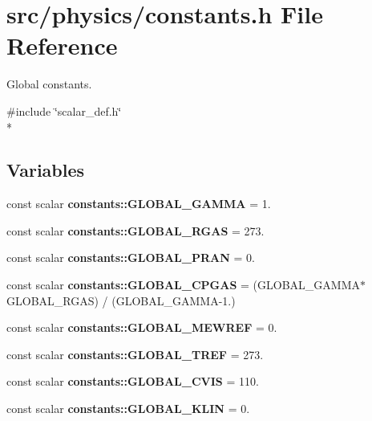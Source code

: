 \section{src/physics/constants.h File Reference}
\label{constants_8h}


Global constants.  


{\ttfamily \#include \char`\"{}scalar\-\_\-def.\-h\char`\"{}}\\*
\subsection*{Variables}
\begin{DoxyCompactItemize}
\item 
const scalar {\bfseries constants\-::\-G\-L\-O\-B\-A\-L\-\_\-\-G\-A\-M\-M\-A} = 1.\label{namespaceconstants_ad42591610ac99d42e07dd55f4b21f644}

\item 
const scalar {\bfseries constants\-::\-G\-L\-O\-B\-A\-L\-\_\-\-R\-G\-A\-S} = 273.\label{namespaceconstants_a4626bf9b70df5f7d210c417a1a289c7b}

\item 
const scalar {\bfseries constants\-::\-G\-L\-O\-B\-A\-L\-\_\-\-P\-R\-A\-N} = 0.\label{namespaceconstants_a3ab911ef1a3ce059745291c010c0d848}

\item 
const scalar {\bfseries constants\-::\-G\-L\-O\-B\-A\-L\-\_\-\-C\-P\-G\-A\-S} = (G\-L\-O\-B\-A\-L\-\_\-\-G\-A\-M\-M\-A$\ast$G\-L\-O\-B\-A\-L\-\_\-\-R\-G\-A\-S) / (G\-L\-O\-B\-A\-L\-\_\-\-G\-A\-M\-M\-A-\/1.)\label{namespaceconstants_a6bb505aea5de44f15baacfe4e2e65605}

\item 
const scalar {\bfseries constants\-::\-G\-L\-O\-B\-A\-L\-\_\-\-M\-E\-W\-R\-E\-F} = 0.\label{namespaceconstants_ad00c7a37d93a7c052fe6ba743fe13388}

\item 
const scalar {\bfseries constants\-::\-G\-L\-O\-B\-A\-L\-\_\-\-T\-R\-E\-F} = 273.\label{namespaceconstants_aab82f463a810ab6d5473bb175f60222f}

\item 
const scalar {\bfseries constants\-::\-G\-L\-O\-B\-A\-L\-\_\-\-C\-V\-I\-S} = 110.\label{namespaceconstants_a17dcb0261024db94d8f45c5d6d747c3e}

\item 
const scalar {\bfseries constants\-::\-G\-L\-O\-B\-A\-L\-\_\-\-K\-L\-I\-N} = 0.\label{namespaceconstants_a01cb8268019ef727e6d59f79c997ab17}


\end{DoxyCompactItemize}
